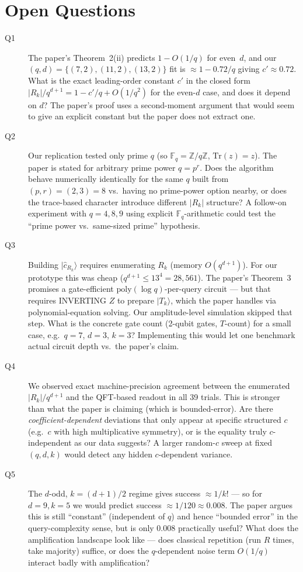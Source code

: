 \documentclass[11pt]{article}
\begin{document}
\section{Open Questions}

\begin{description}
\item[Q1] The paper's Theorem~2(ii) predicts $1 - O(1/q)$ for even~$d$, and our
$(q, d) = \{(7,2),(11,2),(13,2)\}$ fit is $\approx 1 - 0.72/q$ giving $c' \approx 0.72$.  What is
the exact leading-order constant $c'$ in the closed form $|R_k|/q^{d+1} = 1 - c'/q + O(1/q^2)$
for the even-$d$ case, and does it depend on $d$?  The paper's proof uses a second-moment argument
that would seem to give an explicit constant but the paper does not extract one.

\item[Q2] Our replication tested only prime $q$ (so $\mathbb{F}_q = \mathbb{Z}/q\mathbb{Z}$,
$\mathrm{Tr}(z) = z$).  The paper is stated for arbitrary prime power $q = p^r$.  Does the
algorithm behave numerically identically for the same $q$ built from $(p, r) = (2, 3) = 8$
vs.\ having no prime-power option nearby, or does the trace-based character introduce
different $|R_k|$ structure?  A follow-on experiment with $q = 4, 8, 9$ using explicit
$\mathbb{F}_q$-arithmetic could test the ``prime power vs.\ same-sized prime'' hypothesis.

\item[Q3] Building $|\hat c_{R_k}\rangle$ requires enumerating $R_k$ (memory $O(q^{d+1})$).
For our prototype this was cheap ($q^{d+1} \le 13^4 = 28{,}561$).  The paper's Theorem~3
promises a gate-efficient $\mathrm{poly}(\log q)$-per-query circuit — but that requires
INVERTING $Z$ to prepare $|T_k\rangle$, which the paper handles via polynomial-equation
solving.  Our amplitude-level simulation skipped that step.  What is the concrete
gate count (2-qubit gates, $T$-count) for a small case, e.g.\ $q = 7$, $d = 3$, $k = 3$?
Implementing this would let one benchmark actual circuit depth vs.\ the paper's claim.

\item[Q4] We observed exact machine-precision agreement between the enumerated
$|R_k|/q^{d+1}$ and the QFT-based readout in all 39 trials.  This is stronger than what
the paper is claiming (which is bounded-error).  Are there \emph{coefficient-dependent}
deviations that only appear at specific structured $c$ (e.g.\ $c$ with high multiplicative
symmetry), or is the equality truly $c$-independent as our data suggests?  A larger
random-$c$ sweep at fixed $(q, d, k)$ would detect any hidden $c$-dependent variance.

\item[Q5] The $d$-odd, $k = (d+1)/2$ regime gives success $\approx 1/k!$ --- so for $d = 9,
k = 5$ we would predict success $\approx 1/120 \approx 0.008$.  The paper argues this is
still ``constant'' (independent of $q$) and hence ``bounded error'' in the query-complexity
sense, but is only 0.008 practically useful?  What does the amplification landscape look
like — does classical repetition (run $R$ times, take majority) suffice, or does the
$q$-dependent noise term $O(1/q)$ interact badly with amplification?
\end{description}
\end{document}

